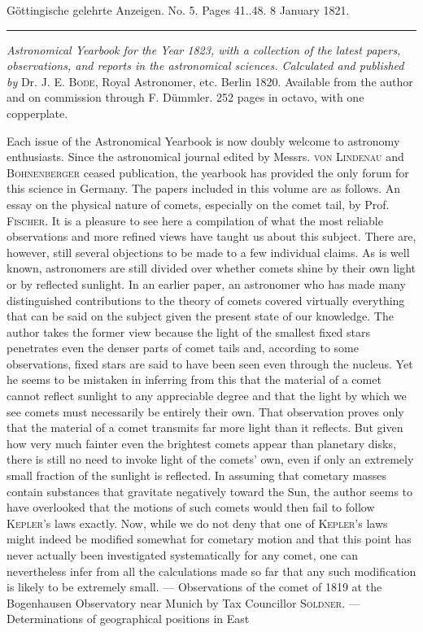\clearpage
{}
\hypertarget{native-630-lower}{}
\begin{center}\small Göttingische gelehrte Anzeigen. No. 5. Pages 41..48. 8 January 1821.\\[3pt]\rule{.72\linewidth}{.3pt}\end{center}

\emph{Astronomical Yearbook for the Year \textup{1823}, with a collection of the latest papers, observations, and reports in the astronomical sciences. Calculated and published by} Dr. J. E. \textsc{Bode}, Royal Astronomer, etc. Berlin 1820. Available from the author and on commission through F. Dümmler. 252 pages in octavo, with one copperplate.

\begingroup{}\baselineskip=13.2pt\relax
Each issue of the Astronomical Yearbook is now doubly welcome to astronomy enthusiasts. Since the astronomical journal edited by Messrs. \textsc{von Lindenau} and \textsc{Bohnenberger} ceased publication, the yearbook has provided the only forum for this science in Germany. The papers included in this volume are as follows. An essay on the physical nature of comets, especially on the comet tail, by Prof. \textsc{Fischer}. It is a pleasure to see here a compilation of what the most reliable observations and more refined views have taught us about this subject. There are, however, still several objections to be made to a few individual claims. As is well known, astronomers are still divided over whether comets shine by their own light or by reflected sunlight. In an earlier paper, an astronomer who has made many distinguished contributions to the theory of comets covered virtually everything that can be said on the subject given the present state of our knowledge. The author takes the former view because the light of the smallest fixed stars penetrates even the denser parts of comet tails and, according to some observations, fixed stars are said to have been seen even through the nucleus. Yet he seems to be mistaken in inferring from this that the material of a comet cannot reflect sunlight to any appreciable degree and that the light by which we see comets must necessarily be entirely their own. That observation proves only that the material of a comet transmits far more light than it reflects. But given how very much fainter even the brightest comets appear than planetary disks, there is still no need to invoke light of the comets' own, even if only an extremely small fraction of the sunlight is reflected. In assuming that cometary masses contain substances that gravitate negatively toward the Sun, the author seems to have overlooked that the motions of such comets would then fail to follow \textsc{Kepler}'s laws exactly. Now, while we do not deny that one of \textsc{Kepler}'s laws might indeed be modified somewhat for cometary motion and that this point has never actually been investigated systematically for any comet, one can nevertheless infer from all the calculations made so far that any such modification is likely to be extremely small. --- Observations of the comet of 1819 at the Bogenhausen Observatory near Munich by Tax Councillor \textsc{Soldner}. --- Determinations of geographical positions in East 